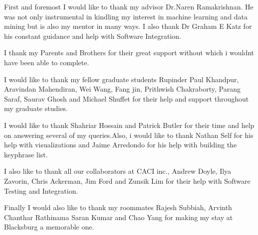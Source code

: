 \vspace*{\fill}
 First and foremost I would like to thank my advisor Dr.Naren Ramakrishnan. He was not only instrumental in kindling my interest in machine learning and data mining but is also my mentor in many ways. I also thank Dr Graham E Katz for his constant guidance and help with Software Integration.

I thank my Parents and Brothers for their great support without which i wouldnt have been able to complete.

I would like to thank my fellow graduate students Rupinder Paul Khandpur, Aravindan Mahendiran, Wei Wang, Fang jin, Prithwish Chakraborty, Parang Saraf, Saurav Ghosh and Michael Shuffet for their help and support throughout my graduate studies. 

I would like to thank Shahriar Hossain and Patrick Butler for their time and help on answering several of my queries.Also, i would like to thank Nathan Self for his help with visualizations and Jaime Arredondo for his help with building the keyphrase list.

I also like to thank all our collaborators at CACI inc., Andrew Doyle, Ilya Zavorin, Chris Ackerman, Jim Ford and Zunsik Lim for their help with Software Testing and Integration.

Finally I would also like to thank my roommates Rajesh Subbiah, Arvinth Chanthar Rathinama Saran Kumar and Chao Yang for making my stay at Blacksburg a memorable one.

\vspace{\fill}

